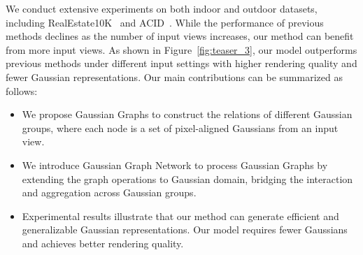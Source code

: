 We conduct extensive experiments on both indoor and outdoor datasets, including RealEstate10K~\cite{RealEstate10K2018} and ACID~\cite{ACID2021ICCV}.
While the performance of previous methods declines as the number of input views increases, our method can benefit from more input views. As shown in Figure~\ref{fig:teaser_3}, our model outperforms previous methods under different input settings with higher rendering quality and fewer Gaussian representations.
Our main contributions can be summarized as follows:
\begin{itemize}[leftmargin=*]
    \item We propose Gaussian Graphs to construct the relations of different Gaussian groups, where each node is a set of pixel-aligned Gaussians from an input view.
    \item We introduce Gaussian Graph Network to process Gaussian Graphs by extending the graph operations to Gaussian domain, bridging the interaction and aggregation across Gaussian groups.
    \item Experimental results illustrate that our method can generate efficient and generalizable Gaussian representations. Our model requires fewer Gaussians and achieves better rendering quality.
\end{itemize}

